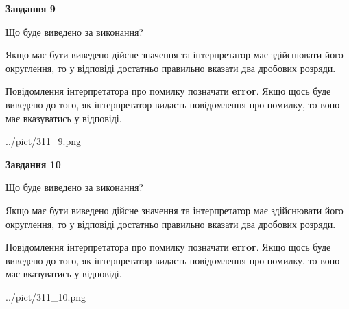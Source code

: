 \documentclass[12pt, ukrainian]{article}
\begin{document}
{\begin {Large}
{\begin {center}\textbf{Завдання 9}\end {center}}\par
Що буде виведено за виконання? \par

Якщо має бути виведено дійсне значення та інтерпретатор має здійснювати його округлення, 
то у відповіді достатньо правильно вказати два дробових розряди.

Повідомлення інтерпретатора про помилку позначати \textbf{error}.
Якщо щось буде виведено до того, як інтерпретатор видасть повідомлення про помилку, 
то воно має вказуватись у відповіді. \par

\begin{center}
	{../pict/311_9.png}
\end{center}
\newpage

{\begin {center}\textbf{Завдання 10}\end {center}}\par
Що буде виведено за виконання? \par

Якщо має бути виведено дійсне значення та інтерпретатор має здійснювати його округлення, 
то у відповіді достатньо правильно вказати два дробових розряди.

Повідомлення інтерпретатора про помилку позначати \textbf{error}.
Якщо щось буде виведено до того, як інтерпретатор видасть повідомлення про помилку, 
то воно має вказуватись у відповіді. \par

\begin{center}
	{../pict/311_10.png}
\end{center}
\newpage

\end {Large}}
\end{document}
